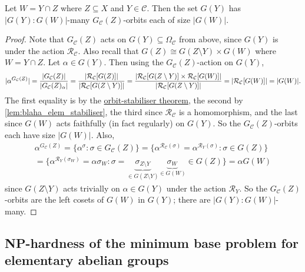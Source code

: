 
\begin{lemma}\label{lem:blaha_elem_orbits_size}
    Let $W = Y \cap Z$ where $Z \subseteq X$ and $Y \in \mathcal{C}$. Then the set $G(Y)$ has $|G(Y) : G(W)|$-many $G_\mathcal{C}(Z)$-orbits each of size $|G(W)|$.
\end{lemma}

\begin{proof}
    Note that $G_\mathcal{C}(Z)$ acts on $G(Y) \subseteq \Omega_\mathcal{C}$ from above, since $G(Y)$ is  under the action $\mathcal{R}_\mathcal{C}$. Also recall that $G(Z) \cong G(Z \setminus Y) \times G(W)$ where $W = Y \cap Z$. Let $\alpha \in G(Y)$. Then using the $G_\mathcal{C}(Z)$-action on $G(Y)$,
    $$|\alpha^{G_\mathcal{C}(Z)}| = \frac{|G_\mathcal{C}(Z)|}{|\added{2}{G_\mathcal{C}(Z)_\alpha}|} = \frac{|\mathcal{R}_\mathcal{C}[G(Z)]|}{|\mathcal{R}_\mathcal{C}[G(Z \setminus Y)]|} = \frac{|\mathcal{R}_\mathcal{C}[G(Z \setminus Y)] \times \mathcal{R}_\mathcal{C}[G(W)]|}{|\mathcal{R}_\mathcal{C}[G(Z \setminus Y)]|} = |\mathcal{R}_\mathcal{C}[G(W)]| = |G(W)|.$$
    The first equality is by the \hyperref[thm:orbit_stabiliser]{orbit-stabiliser theorem}, the second by \autoref{lem:blaha_elem_stabiliser}, the third since $\mathcal{R}_\mathcal{C}$ is a homomorphism, and the last since $G(W)$ acts faithfully (in fact regularly) on $G(Y)$. So the $G_\mathcal{C}(Z)$-orbits each have size $|G(W)|$. Also,
    \begin{multline*}
        \alpha^{G_\mathcal{C}(Z)} = \{\alpha^\sigma : \sigma \in G_\mathcal{C}(Z)\} = \{\alpha^{\mathcal{R}_\mathcal{C}(\sigma)} = \alpha^{\mathcal{R}_Y(\sigma)} : \sigma \in G(Z)\} \\
        = \{\alpha^{\mathcal{R}_Y(\sigma_W)} = \alpha\sigma_W : \sigma = \underbrace{\sigma_{Z \setminus Y}}_{\in G(Z \setminus Y)}\underbrace{\sigma_W}_{\in G(W)} \in G(Z)\} = \alpha G(W)
    \end{multline*}
    since $G(Z \setminus Y)$ acts trivially  on $\alpha \in G(Y)$ under the action $\mathcal{R}_Y$. So the $G_\mathcal{C}(Z)$-orbits are the left cosets of $G(W)$ in $G(Y)$; there are $|G(Y) : G(W)|$-many.
\end{proof}

\subsection{NP-hardness of the minimum base problem for elementary abelian groups}

